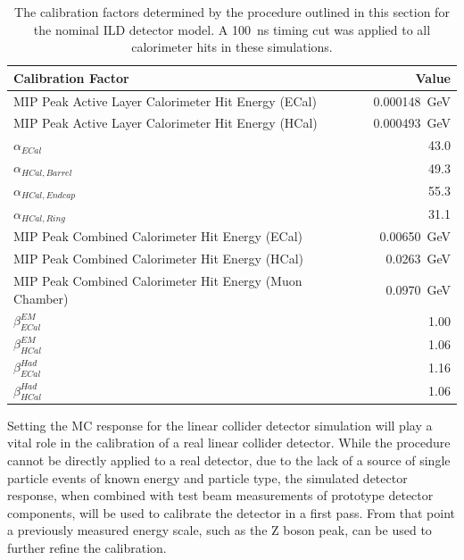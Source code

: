 \begin{table}[h!]
\centering
\begin{tabular}{l r}
\hline
Calibration Factor & Value \\
\hline
MIP Peak Active Layer Calorimeter Hit Energy (ECal) & 0.000148~GeV \\
MIP Peak Active Layer Calorimeter Hit Energy (HCal) & 0.000493~GeV \\
$\alpha_{ECal}$ & 43.0 \\
$\alpha_{HCal, Barrel}$ & 49.3 \\
$\alpha_{HCal, Endcap}$ & 55.3 \\
$\alpha_{HCal, Ring}$ & 31.1 \\
MIP Peak Combined Calorimeter Hit Energy (ECal) & 0.00650~GeV \\
MIP Peak Combined Calorimeter Hit Energy (HCal) & 0.0263~GeV \\
MIP Peak Combined Calorimeter Hit Energy (Muon Chamber) & 0.0970~GeV \\
$\beta^{EM}_{ECal}$ & 1.00 \\
$\beta^{EM}_{HCal}$ & 1.06 \\
$\beta^{Had}_{ECal}$ & 1.16 \\
$\beta^{Had}_{HCal}$ & 1.06 \\
\end{tabular}
\caption[{The calibration factors determined by the procedure outlined in this section for the nominal ILD detector model.  A 100~ns timing cut was applied to all calorimeter hits in these simulations.}]{{The calibration factors determined by the procedure outlined in this section for the nominal ILD detector model.  A 100~ns timing cut was applied to all calorimeter hits in these simulations.}}
\label{table:scenario}
\end{table}

{Setting the MC response for the linear collider detector simulation will play a vital role in the calibration of a real linear collider detector.  While the procedure cannot be directly applied to a real detector, due to the lack of a source of single particle events of known energy and particle type, the simulated detector response, when combined with test beam measurements of prototype detector components, will be used to calibrate the detector in a first pass.  From that point a previously measured energy scale, such as the Z boson peak, can be used to further refine the calibration.} 


